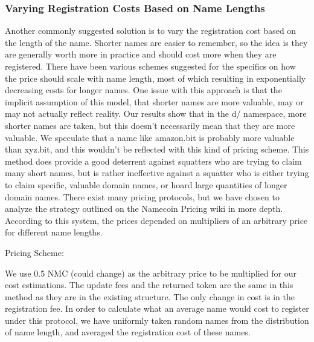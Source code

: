 \subsubsection{Varying Registration Costs Based on Name Lengths}
    Another commonly suggested solution is to vary the registration cost based on the length of the name. Shorter names are easier to remember, so the idea is they are generally worth more in practice and should cost more when they are registered. There have been various schemes suggested for the specifics on how the price should scale with name length, most of which resulting in exponentially decreasing costs for longer names. One issue with this approach is that the implicit assumption of this model, that shorter names are more valuable, may or may not actually reflect reality. Our results show that in the d/ namespace, more shorter names are taken, but this doesn't necessarily mean that they are more valuable. We speculate that a name like amazon.bit is probably more valuable than xyz.bit, and this wouldn't be reflected with this kind of pricing scheme.  This method does provide a good deterrent against squatters who are trying to claim many short names, but is rather ineffective against a squatter who is either trying to claim specific, valuable domain names, or hoard large quantities of longer domain names. 
    There exist many pricing protocols, but we have chosen to analyze the strategy outlined on the Namecoin Pricing wiki in more depth. According to this system, the prices depended on multipliers of an arbitrary price for different name lengths. 

Pricing Scheme:


    We use 0.5 NMC (could change) as the arbitrary price to be multiplied for our cost estimations. The update fees and the returned token are the same in this method as they are in the existing structure. The only change in cost is in the registration fee. In order to calculate what an average name would cost to register under this protocol, we have uniformly taken random names from the distribution of name length, and averaged the registration cost of these names. 



